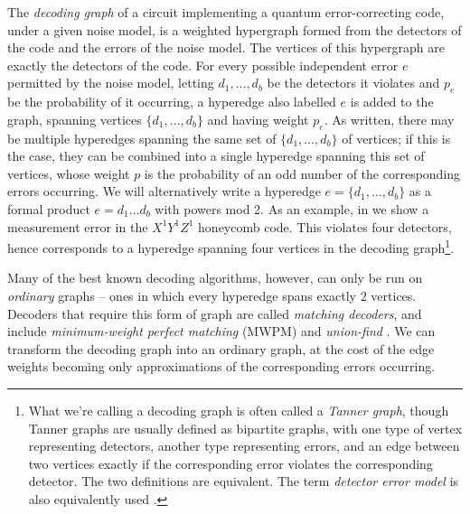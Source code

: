 The \textit{decoding graph} of a circuit implementing a quantum error-correcting code, under a given noise model, is a weighted hypergraph formed from the detectors of the code and the errors of the noise model.
The vertices of this hypergraph are exactly the detectors of the code.
For every possible independent error $e$ permitted by the noise model, letting $d_1, \ldots, d_b$ be the detectors it violates
and $p_e$ be the probability of it occurring,
a hyperedge also labelled $e$ is added to the graph, spanning vertices $\{d_1, \ldots, d_b\}$ and having weight $p_e$. 
As written, there may be multiple hyperedges spanning the same set of $\{d_1, \ldots , d_b\}$ of vertices;
if this is the case, they can be combined into a single hyperedge spanning this set of vertices,
whose weight $p$ is the probability of an odd number of the corresponding errors occurring.
We will alternatively write a hyperedge $e = \{d_1, \ldots, d_b\}$ as a formal product $e = d_1 \ldots d_b$ with powers mod 2.
As an example, in  we show a measurement error in the $X^1Y^1Z^1$ honeycomb code.
This violates four detectors, hence corresponds to a hyperedge spanning four vertices in the decoding graph\footnote{What we're calling a decoding graph is often called a \textit{Tanner graph}, though Tanner graphs are usually defined as bipartite graphs, with one type of vertex representing detectors, another type representing errors, and an edge between two vertices exactly if the corresponding error violates the corresponding detector. 
The two definitions are equivalent. The term \textit{detector error model} is also equivalently used \cite{gidney2022stim_error_model}.}.

Many of the best known decoding algorithms, however, can only be run on \textit{ordinary} graphs --
ones in which every hyperedge spans exactly $2$ vertices.
Decoders that require this form of graph are called \textit{matching decoders},
and include \textit{minimum-weight perfect matching} (MWPM) 
\cite{MWPM,dennis2002topological,MWPMColor}
and \textit{union-find} \cite{PhysRevResearch.2.033042,UnionFind}. 
We can transform the decoding graph into an ordinary graph, at the cost of the edge weights becoming only approximations of the corresponding errors occurring.

